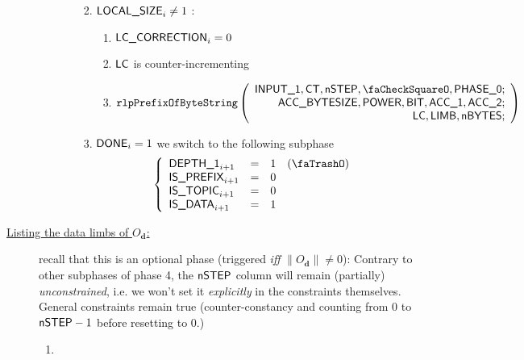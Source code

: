 \begin{description}
\begin{enumerate}[resume]
\begin{enumerate}
\begin{enumerate}
\begin{enumerate}
\begin{itemize}
										\end{itemize}
								\end{enumerate}
							\item \If $\textsf{LOCAL\_SIZE}_{i} \neq 1$ \Then:
								\begin{enumerate}
									\item $\textsf{LC\_CORRECTION}_{i}=0$
									\item $\textsf{LC}$ is counter-incrementing
									\item 
										\[
											\rlpPrefixByteString
											\left( \begin{array}{r}
												\Input1,
												\ct,
												\nbstep,
												\done,
												\phase{0}; \\
												\accsize,
												\Power,
												\col{BIT},
												\acc1,
												\acc2; \\
												\lc,
												\limb,
												\limbsize; \\
											\end{array} \right)
										\]
								\end{enumerate}
							\item \If $\textsf{DONE}_{i}=1$ \Then we switch to the following subphase
								\[
									\left\{ \begin{array}{lclr}
										\Depth 1_{i + 1}   & = & 1 & (\trash) \\
										\isprefix_{i + 1}  & = & 0 &          \\
										\isOt_{i + 1}      & = & 0 &          \\
										\isOd_{i + 1}      & = & 1 &          \\
									\end{array} \right.
								\]
						\end{enumerate}
					\end{enumerate}
				\end{enumerate}
			\item[\underline{Listing the data limbs of $O_{\mathbf{d}}$:}] recall that this is an optional phase (triggered \emph{iff} $\|O_\textbf{d}\|\neq0$):
				\saNote{} Contrary to other subphases of phase 4, the $\textsf{nSTEP}$ column will remain (partially) \emph{unconstrained}, i.e. we won't set it \emph{explicitly} in the constraints themselves. General constraints remain true (counter-constancy and \ct{} counting from $0$ to $\textsf{nSTEP} - 1$ before resetting to $0$.)
				\begin{enumerate}[resume]    
					\item \If %

\end{enumerate}
\end{description}
